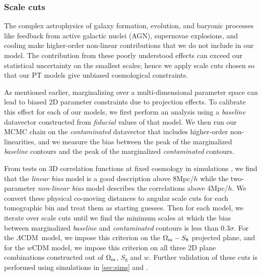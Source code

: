 \documentclass[aps, prd,twocolumn,superscriptaddress,nofootinbib,preprintnumbers]{revtex4-1}
\newcommand{\lcdm}{$\Lambda$CDM}
\begin{document}
\subsubsection{Scale cuts}\label{sec:scale_cuts}

The complex astrophysics of galaxy formation, evolution, and baryonic processes like feedback from active galactic nuclei (AGN), supernovae explosions, and cooling make higher-order non-linear contributions that we do not include in our model. The contribution from these poorly understood effects can exceed our statistical uncertainty on the smallest scales; hence we apply scale cuts chosen so that our PT models give unbiased cosmological constraints.%

As mentioned earlier, marginalizing over a multi-dimensional parameter space can lead to biased 2D parameter constraints due to projection effects. To calibrate this effect for each of our models, we first perform an analysis using a \textit{baseline} datavector constructed from \textit{fiducial} values of that model. 
We then run our MCMC chain on the \textit{contaminated} datavector that includes higher-order non-linearities, and we measure the bias between the peak of the marginalized \textit{baseline} contours and the peak of the marginalized \textit{contaminated} contours. 

From tests on 3D correlation functions at fixed cosmology in simulations \citep{p2020perturbation}, we find that the \textit{linear bias} model is a good description above 8Mpc/$h$ while the two-parameter \textit{non-linear bias} model describes the correlations above 4Mpc/$h$. We convert these physical co-moving distances to angular scale cuts for each tomographic bin and treat them as starting guesses. Then for each model, we iterate over scale cuts until we find the minimum scales at which the bias between marginalized \textit{baseline} and \textit{contaminated} contours is less than $0.3\sigma$. For the \lcdm\ model, we impose this criterion on the $\Omega_{\rm m}-S_8$ projected plane, and for the $w$CDM model, we impose this criterion on all three 2D plane combinations constructed out of $\Omega_{\rm m}$, $S_8$ and $w$. Further validation of these cuts is performed using simulations in \ref{sec:sims} and \citet*{y3-simvalidation}. 
\end{document}

